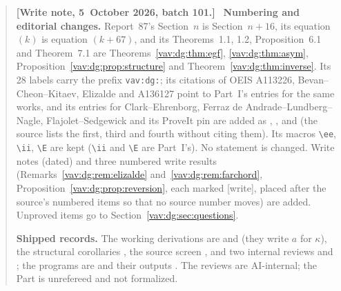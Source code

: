 \documentclass[11pt]{article}
\theoremstyle{remark}\newtheorem{remark}[theorem]{Remark}
\newcommand{\E}{\mathbb E}
\newcommand{\ii}{\mathrm i}
\newenvironment{writenoteb}{\begin{quote}\small\raggedright\textbf{[Write note, 5~October 2026, batch 101.]}\ }{\end{quote}}
\newcommand{\ee}{\mathrm e}
\begin{document}
\begin{writenoteb}
\textbf{Numbering and editorial changes.} Report~87's Section~$n$ is
Section~$n+16$, its equation $(k)$ is equation $(k+67)$, and its
Theorems~1.1, 1.2, Proposition~6.1 and Theorem~7.1 are
Theorems~\ref{vav:dg:thm:egf}, \ref{vav:dg:thm:asym},
Proposition~\ref{vav:dg:prop:structure} and
Theorem~\ref{vav:dg:thm:inverse}. Its 28 labels carry the prefix
\texttt{vav:dg:}; its citations of OEIS A113226, Bevan--Cheon--Kitaev,
Elizalde and A136127 point to Part~I's entries for the same works, and its
entries for Clark--Ehrenborg, Ferraz de Andrade--Lundberg--Nagle,
Flajolet--Sedgewick and its ProveIt pin are added as \cite{clark},
\cite{excedance}, \cite{fs} and \cite{proveitdg} (the source lists the
first, third and fourth without citing them). Its macros \verb|\ee|,
\verb|\ii|, \verb|\E| are kept (\verb|\ii| and \verb|\E| are Part~I's). No
statement is changed. Write notes (dated) and three numbered write results
(Remarks~\ref{vav:dg:rem:elizalde} and~\ref{vav:dg:rem:farchord},
Proposition~\ref{vav:dg:prop:reversion}, each marked [write], placed after
the source's numbered items so that no source number moves) are added.
Unproved items go to Section~\ref{vav:dg:sec:questions}.

\textbf{Shipped records.} The working derivations are
 and
 (they write $a$ for $\kappa$), the
structural corollaries , the
source screen , and two internal reviews
 and
; the programs are
 and their outputs
. The reviews are AI-internal; the Part is
unrefereed and not formalized.
\end{writenoteb}
\end{document}
